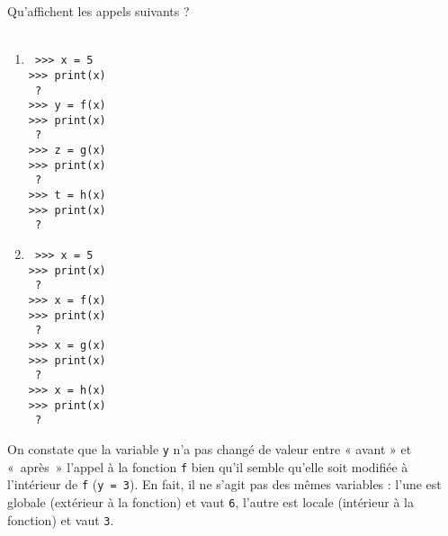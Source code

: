 {\begin{td}
Qu'affichent les appels suivants ?\\
\mbox{}\\
\begin{minipage}{3.5cm}
\begin{enumerate}
\item 
\begin{py}{2.5cm}\tt
>>> x = 5\\
>>> print(x)\\
{\color{red} ?}\\
>>> y = f(x)\\
>>> print(x)\\
{\color{red} ?}\\
>>> z = g(x)\\
>>> print(x)\\
{\color{red} ?}\\
>>> t = h(x)\\
>>> print(x)\\
{\color{red} ?}
\end{py}
\end{enumerate}
\end{minipage}
\hfill
\begin{minipage}{3.5cm}
\begin{enumerate}\setcounter{enumi}{1}
\item 
\begin{py}{2.5cm}\tt
>>> x = 5\\
>>> print(x)\\
{\color{red} ?}\\
>>> x = f(x)\\
>>> print(x)\\
{\color{red} ?}\\
>>> x = g(x)\\
>>> print(x)\\
{\color{red} ?}\\
>>> x = h(x)\\
>>> print(x)\\
{\color{red} ?}
\end{py}
\end{enumerate}
\end{minipage}
\end{td}}
\hfill
\begin{py}{6cm}
On constate que la variable {\tt y} n'a pas changé de valeur entre « avant » et «~après~»
l'appel à la fonction {\tt f} bien qu'il semble qu'elle soit modifiée à 
l'intérieur de {\tt f} ({\tt y = 3}). En fait, il ne s'agit pas des mêmes variables : 
l'une est globale (extérieur à la fonction) et vaut {\tt 6}, l'autre est locale (intérieur à la fonction)
et vaut {\tt 3}. 
\end{py}
\hspace*{1cm}\mbox{}\vspace*{2mm}


